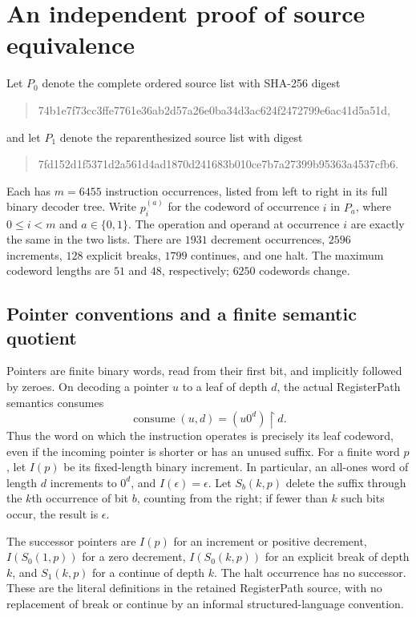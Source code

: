 \section{An independent proof of source equivalence}
\label{sec:independent-source-bisimulation}

Let $P_0$ denote the complete ordered source list with SHA-256 digest
\begin{quote}\small\ttfamily
74b1e7f73cc3ffe7761e36ab2d57a26e0ba34d3ac624f2472799e6ac41d5a51d,
\end{quote}
and let $P_1$ denote the reparenthesized source list with digest
\begin{quote}\small\ttfamily
7fd152d1f5371d2a561d4ad1870d241683b010ce7b7a27399b95363a4537cfb6.
\end{quote}
Each has $m=6455$ instruction occurrences, listed from left to right in
its full binary decoder tree.  Write $p_i^{(a)}$ for the codeword of
occurrence $i$ in $P_a$, where $0\leq i<m$ and $a\in\{0,1\}$.
The operation and operand at occurrence $i$ are exactly the same in
the two lists.  There are $1931$ decrement occurrences, $2596$
increments, $128$ explicit breaks, $1799$ continues, and one halt.
The maximum codeword lengths are $51$ and $48$, respectively;
$6250$ codewords change.

\subsection{Pointer conventions and a finite semantic quotient}

Pointers are finite binary words, read from their first bit, and
implicitly followed by zeroes.  On decoding a pointer $u$ to a leaf
of depth $d$, the actual RegisterPath semantics consumes
\[
  \operatorname{consume}(u,d)=(u0^d)\mathbin{\upharpoonright}d.
\]
Thus the word on which the instruction operates is precisely its
leaf codeword, even if the incoming pointer is shorter or has an
unused suffix.  For a finite word $p$, let $I(p)$ be its fixed-length
binary increment.  In particular, an all-ones word of length $d$
increments to $0^d$, and $I(\epsilon)=\epsilon$.  Let $S_b(k,p)$
delete the suffix through the $k$th occurrence of bit $b$, counting
from the right; if fewer than $k$ such bits occur, the result is
$\epsilon$.

The successor pointers are $I(p)$ for an increment or positive
decrement, $I(S_0(1,p))$ for a zero decrement,
$I(S_0(k,p))$ for an explicit break of depth $k$, and
$S_1(k,p)$ for a continue of depth $k$.  The halt occurrence has
no successor.  These are the literal definitions in the retained
RegisterPath source, with no replacement of break or continue by
an informal structured-language convention.


